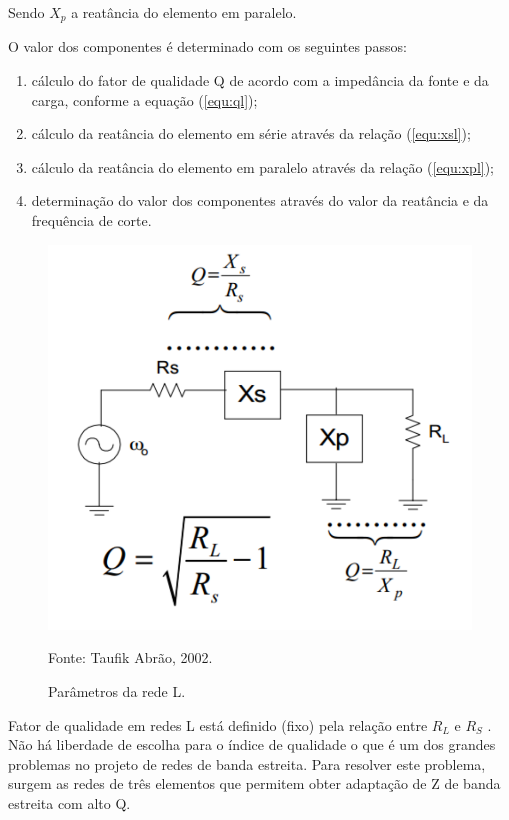 Sendo $X_p$ a reatância do elemento em paralelo.

O valor dos componentes é determinado com os seguintes passos:

\begin{enumerate}
    \item cálculo do fator de qualidade Q de acordo com a impedância da fonte e da carga, conforme a equação (\ref{equ:ql});
    
    \item cálculo da reatância do elemento em série através da relação (\ref{equ:xsl});
        
    \item cálculo da reatância do elemento em paralelo através da relação (\ref{equ:xpl});
    
    \item determinação do valor dos componentes através do valor da reatância e da frequência de corte.
\end{enumerate}

\begin{figure}[H]
    \centering
    \caption{Parâmetros da rede L.}
    \includegraphics[scale=0.3]{Imagens/fig2.png}
    \label{f_fig2}
    
    \small Fonte: Taufik Abrão, 2002.
\end{figure}

Fator de qualidade em redes L está definido (fixo) pela relação entre $R_L$ e $R_S$ . Não há liberdade de escolha para o índice de qualidade o que é um dos grandes problemas no projeto de redes de banda estreita. Para resolver este problema, surgem as redes de três elementos que permitem obter adaptação de Z de banda estreita com alto Q.


